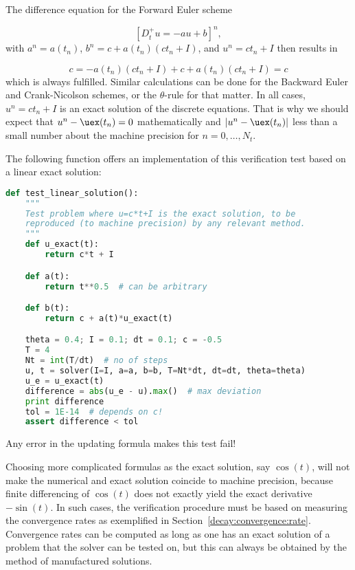 \documentclass[graybox,sectrefs,envcountresetchap,open=right,final]{svmonodo}
\begin{document}
The difference equation for the Forward Euler scheme

\[ [D^+_t u = -au + b]^n, \]
with $a^n=a(t_n)$, $b^n=c + a(t_n)(ct_n + I)$, and $u^n=ct_n + I$
then results in

\[ c = -a(t_n)(ct_n+I) + c + a(t_n)(ct_n + I) = c \]
which is always fulfilled. Similar calculations can be done for the
Backward Euler and Crank-Nicolson schemes, or the $\theta$-rule for
that matter. In all cases, $u^n=ct_n +I$ is an exact solution of
the discrete equations. That is why we should expect that
$u^n - \uex(t_n) =0$ mathematically and $|u^n - \uex(t_n)|$ less
than a small number about the machine precision for $n=0,\ldots,N_t$.

The following function offers an implementation of this verification
test based on a linear exact solution:

























\begin{lstlisting}[language=python,style=blue1_bluegreen]
def test_linear_solution():
    """
    Test problem where u=c*t+I is the exact solution, to be
    reproduced (to machine precision) by any relevant method.
    """
    def u_exact(t):
        return c*t + I

    def a(t):
        return t**0.5  # can be arbitrary

    def b(t):
        return c + a(t)*u_exact(t)

    theta = 0.4; I = 0.1; dt = 0.1; c = -0.5
    T = 4
    Nt = int(T/dt)  # no of steps
    u, t = solver(I=I, a=a, b=b, T=Nt*dt, dt=dt, theta=theta)
    u_e = u_exact(t)
    difference = abs(u_e - u).max()  # max deviation
    print difference
    tol = 1E-14  # depends on c!
    assert difference < tol

\end{lstlisting}

Any error in the updating formula makes this test fail!

Choosing more complicated formulas as the exact solution, say
$\cos(t)$, will not make the numerical and exact solution
coincide to machine precision, because finite differencing of
$\cos(t)$ does not exactly yield the exact derivative $-\sin(t)$.
In such cases, the verification procedure
must be based on measuring the convergence rates as exemplified in
Section~\ref{decay:convergence:rate}. Convergence rates can be
computed as long as one has
an exact solution of a problem that the solver can be tested on, but
this can always be obtained by the method of manufactured solutions.
\end{document}

